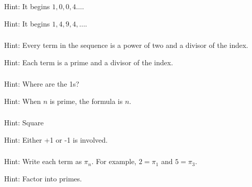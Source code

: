 \subsubsection*{ \answers}
\begin{apart}
    \item Hint: It begins $1,0,0,4\ldots$.
    \item Hint: It begins $1, 4, 9, 4, \ldots$.
\end{apart}

\subsubsection*{ \answers}
\begin{apart}
    \item Hint: Every term in the sequence is a power of two and a divisor of the index.
    \item Hint: Each term is a prime and a divisor of the index.
\end{apart}

\subsubsection*{ \answers}
\begin{apart}
    \item Hint: Where are the 1s?
    \item Hint: When $n$ is prime, the formula is $n$. 
\end{apart}

\subsubsection*{ \answers}
\begin{apart}
    \item Hint: Square
    \item Hint: Either +1 or -1 is involved.
\end{apart} 

\subsubsection*{ \answers}
\begin{apart}
    \item Hint: Write each term as $\pi_n$.  For example, $2 = \pi_1$ and $5 = \pi_3$.
    \item Hint: Factor into primes.
\end{apart}











